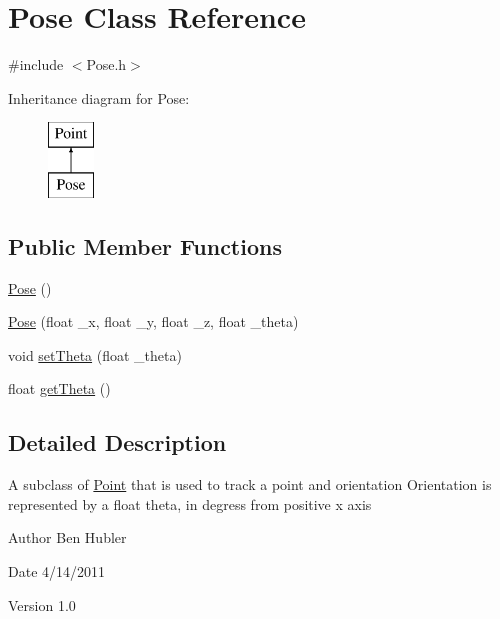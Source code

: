 \hypertarget{class_pose}{
\section{Pose Class Reference}
\label{class_pose}
}


{\ttfamily \#include $<$Pose.h$>$}

Inheritance diagram for Pose:\begin{figure}[H]
\begin{center}
\leavevmode
\includegraphics[height=2.000000cm]{class_pose}
\end{center}
\end{figure}
\subsection*{Public Member Functions}
\begin{DoxyCompactItemize}
\item 
\hyperlink{class_pose_a8a4171c8a6b09e37fb011997da9ea2ad}{Pose} ()
\item 
\hyperlink{class_pose_a3cd8aa60acd61ec0d1ea7cf2da0f1bc7}{Pose} (float \_\-x, float \_\-y, float \_\-z, float \_\-theta)
\item 
void \hyperlink{class_pose_afc4307f8493a10dc3a920502365dcd01}{setTheta} (float \_\-theta)
\item 
float \hyperlink{class_pose_ac68d4bed5fbbe3122451179df5dfd491}{getTheta} ()
\end{DoxyCompactItemize}


\subsection{Detailed Description}
A subclass of \hyperlink{class_point}{Point} that is used to track a point and orientation Orientation is represented by a float theta, in degress from positive x axis \begin{DoxyAuthor}{Author}
Ben Hubler 
\end{DoxyAuthor}
\begin{DoxyDate}{Date}
4/14/2011 
\end{DoxyDate}
\begin{DoxyVersion}{Version}
1.0 
\end{DoxyVersion}


